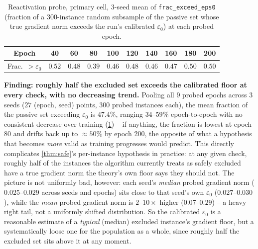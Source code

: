 \documentclass{article}
\theoremstyle{plain}
\theoremstyle{definition}
\theoremstyle{remark}
\begin{document}
\begin{table}[h]
\caption{Reactivation probe, primary cell, 3-seed mean of \texttt{frac\_exceed\_eps0} (fraction of a 300-instance random subsample of the passive set whose true gradient norm exceeds the run's calibrated $\varepsilon_0$) at each probed epoch.}
\label{tab:reactprobe}
\centering
\small
\begin{tabular}{cccccccccc}
\toprule
Epoch & 40 & 60 & 80 & 100 & 120 & 140 & 160 & 180 & 200 \\
\midrule
Frac.\ $>\varepsilon_0$ & $0.52$ & $0.48$ & $0.39$ & $0.46$ & $0.48$ & $0.46$ & $0.47$ & $0.50$ & $0.50$ \\
\bottomrule
\end{tabular}
\end{table}

\textbf{Finding: roughly half the excluded set exceeds the calibrated floor at every check, with no decreasing trend.} Pooling all 9 probed epochs across 3 seeds ($27$ (epoch, seed) points, $300$ probed instances each), the mean fraction of the passive set exceeding $\varepsilon_0$ is $47.4\%$, ranging $34$--$59\%$ epoch-to-epoch with no consistent decrease over training (\cref{tab:reactprobe}) -- if anything, the fraction is lowest at epoch 80 and drifts back up to $\approx\!50\%$ by epoch 200, the opposite of what a hypothesis that becomes \emph{more} valid as training progresses would predict. This directly complicates \cref{thm:safe}'s per-instance hypothesis in practice: at any given check, roughly half of the instances the algorithm currently treats as safely excluded have a true gradient norm the theory's own floor says they should not. The picture is not uniformly bad, however: each seed's \emph{median} probed gradient norm ($0.025$--$0.029$ across seeds and epochs) sits close to that seed's own $\varepsilon_0$ ($0.027$--$0.030$), while the \emph{mean} probed gradient norm is $2$--$10\times$ higher ($0.07$--$0.29$) -- a heavy right tail, not a uniformly shifted distribution. So the calibrated $\varepsilon_0$ is a reasonable estimate of a \emph{typical} (median) excluded instance's gradient floor, but a systematically loose one for the population as a whole, since roughly half the excluded set sits above it at any moment.
\end{document}
